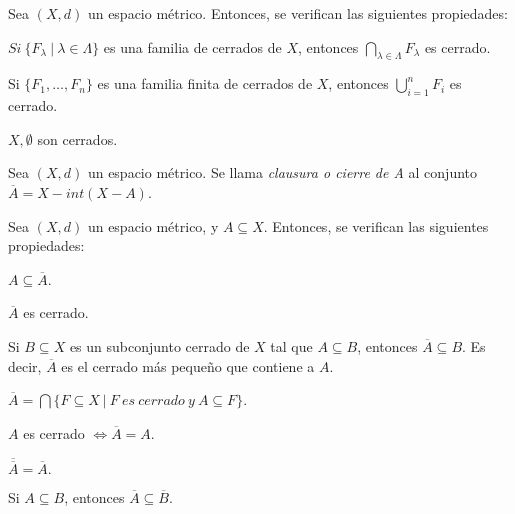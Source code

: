 \begin{nprop}
Sea $(X,d)$ un espacio métrico. Entonces, se verifican las siguientes propiedades:

\begin{nlist}
\item $Si\ \{F_\lambda \ | \ \lambda \in \Lambda \}$ es una familia de cerrados de $X$, entonces $\displaystyle \bigcap_{\lambda \in \Lambda} F_\lambda$ es cerrado.

\item Si $\{F_1,\dots, F_n\}$ es una familia finita de cerrados de $X$, entonces $\displaystyle \bigcup_{i=1}^n F_i$ es cerrado.

\item $X,\emptyset$ son cerrados.
\end{nlist}

\end{nprop}



\begin{ndef}[Clausura]
Sea $(X,d)$ un espacio métrico. Se llama \textit{clausura o cierre de A} al conjunto $\overline{A} = X - int(X-A)$.
\end{ndef}



\begin{nprop}
Sea $(X,d)$ un espacio métrico, y $A\subseteq X$. Entonces, se verifican las siguientes propiedades:
\begin{nlist}
\item $A \subseteq \overline{A}$.

\item $\overline{A}$ es cerrado.

\item Si $B\subseteq X$ es un subconjunto cerrado de $X$ tal que $A\subseteq B$, entonces $\overline{A} \subseteq B$. Es decir, $\overline{A}$ es el cerrado más pequeño que contiene a $A$.

\item $\displaystyle \overline{A}  = \bigcap \{ F\subseteq X \ | \ F\ es\ cerrado\ y\ A\subseteq F \}$.

\item $A$ es cerrado $\iff \overline{A} = A$.

\item $\overline{\overline{A}} = \overline{A}.$

\item Si $A\subseteq B$, entonces $\overline{A} \subseteq \overline{B}$.
\end{nlist}

\end{nprop}



